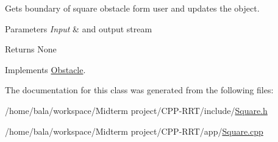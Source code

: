Gets boundary of square obstacle form user and updates the object. 


\begin{DoxyParams}{Parameters}
{\em Input} & and output stream \\
\hline
\end{DoxyParams}
\begin{DoxyReturn}{Returns}
None 
\end{DoxyReturn}


Implements \hyperlink{classObstacle_a8915ad90dc24f48df3ff0c38e8c695aa}{Obstacle}.



The documentation for this class was generated from the following files\+:\begin{DoxyCompactItemize}
\item 
/home/bala/workspace/\+Midterm project/\+C\+P\+P-\/\+R\+R\+T/include/\hyperlink{Square_8h}{Square.\+h}\item 
/home/bala/workspace/\+Midterm project/\+C\+P\+P-\/\+R\+R\+T/app/\hyperlink{Square_8cpp}{Square.\+cpp}\end{DoxyCompactItemize}
